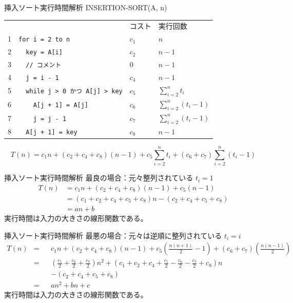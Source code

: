 \documentclass[unicode,11pt,aspectratio=169,notes]{beamer} %
\begin{document}
\begin{frame}[fragile]{挿入ソート}{実行時間解析}
  INSERTION-SORT(A, n)

  \begin{tabular}{rlll}
    & & コスト & 実行回数 \\
    1 & \verb|for i = 2 to n| & $c_1$ & $n$ \\
    2 & \verb|  key = A[i]| & $c_2$ & $n-1$ \\
    3 & \verb|  // コメント| & $0$ & $n-1$ \\
    4 & \verb|  j = i - 1| & $c_4$ & $n-1$ \\
    5 & \verb|  while j > 0 かつ A[j] > key| & $c_5$ & $\sum_{i=2}^nt_i$ \\
    6 & \verb|    A[j + 1] = A[j]| & $c_6$ & $\sum_{i=2}^n\left(t_i-1\right)$ \\
    7 & \verb|    j = j - 1| & $c_7$ & $\sum_{i=2}^n\left(t_i-1\right)$ \\
    8 & \verb|  A[j + 1] = key| & $c_8$ & $n-1$
  \end{tabular}
  \[
    T(n) = c_1n + \left(c_2+c_4+c_8\right)\left(n-1\right) + c_5\sum_{i=2}^nt_i
    + \left(c_6+c_7\right)\sum_{i=2}^n\left(t_i-1\right)
  \]
\end{frame}

\begin{frame}{挿入ソート}{実行時間解析}
  最良の場合：元々整列されている $ t_i = 1 $
  \begin{align*}
    T(n) &= c_1n + \left(c_2+c_4+c_8\right)\left(n-1\right)
                 + c_5\left(n-1\right) \\
         &= \left(c_1+c_2+c_4+c_5+c_8\right)n - \left(c_2+c_4+c_5+c_8\right) \\
         &= an + b
  \end{align*}
  実行時間は入力の大きさの線形関数である。
\end{frame}

\begin{frame}{挿入ソート}{実行時間解析}
  最悪の場合：元々は逆順に整列されている $ t_i = i $
  \begin{align*}
    T(n) &= &&c_1n + \left(c_2+c_4+c_8\right)\left(n-1\right)
                 + c_5\left(\frac{n(n+1)}{2}-1\right)
                 + \left(c_6+c_7\right)\left(\frac{n(n-1)}{2}\right) \\
         &= &&\left(\frac{c_5}{2}+\frac{c_6}{2}+\frac{c_7}{2}\right)n^2
            + \left(c_1+c_2+c_4+\frac{c_5}{2}-\frac{c_6}{2}-\frac{c_7}{2}+c_8\right)n \\
         &  &&- \left(c_2+c_4+c_5+c_8\right) \\
         &= &&an^2 + bn + c
  \end{align*}
  実行時間は入力の大きさの線形関数である。
\end{frame}
\end{document}
